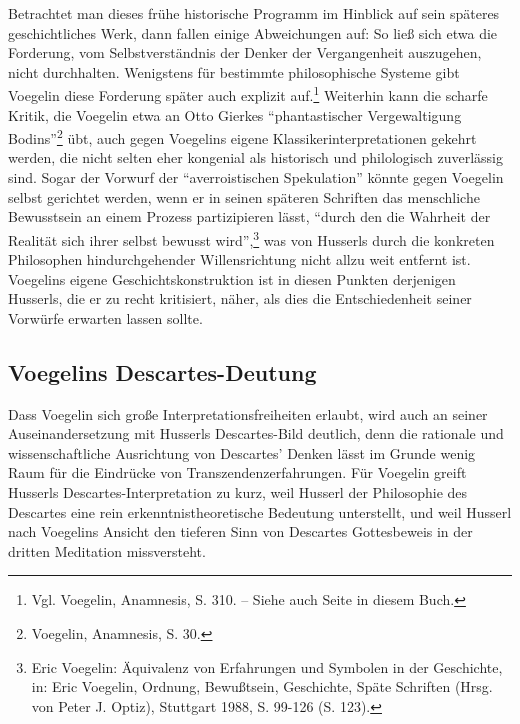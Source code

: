 Betrachtet man dieses frühe historische Programm im Hinblick auf sein späteres
geschichtliches Werk, dann fallen einige Abweichungen auf: So ließ sich etwa
die Forderung, vom Selbstverständnis der Denker der Vergangenheit auszugehen,
nicht durchhalten. Wenigstens für bestimmte philosophische Systeme gibt
Voegelin diese Forderung später auch explizit auf.\footnote{Vgl. Voegelin,
  Anamnesis, S. 310. -- Siehe auch Seite \pageref{Selbstzeugnisse2} in diesem
  Buch.}  Weiterhin kann die scharfe Kritik, die Voegelin etwa an Otto
Gierkes "`phantastischer Vergewaltigung Bodins"'\footnote{Voegelin, Anamnesis,
  S. 30.}  übt, auch gegen Voegelins eigene Klassikerinterpretationen gekehrt
werden, die nicht selten eher kongenial als historisch und philologisch
zuverlässig sind.  Sogar der Vorwurf der "`averroistischen Spekulation"'
könnte gegen Voegelin selbst gerichtet werden, wenn er in seinen späteren
Schriften das menschliche Bewusstsein an einem Prozess partizipieren lässt,
"`durch den die Wahrheit der Realität sich ihrer selbst bewusst
wird"',\footnote{Eric Voegelin: Äquivalenz von Erfahrungen und Symbolen in der
  Geschichte, in: Eric Voegelin, Ordnung, Bewußtsein, Geschichte, Späte
  Schriften (Hrsg. von Peter J. Optiz), Stuttgart 1988, S. 99-126 (S. 123).}
was von Husserls durch die konkreten Philosophen hindurchgehender
Willensrichtung nicht allzu weit entfernt ist.  Voegelins eigene
Geschichtskonstruktion ist in diesen Punkten derjenigen Husserls, die er zu
recht kritisiert, näher, als dies die Entschiedenheit seiner Vorwürfe erwarten
lassen sollte.


\subsection{Voegelins Descartes-Deutung}

Dass Voegelin sich große Interpretationsfreiheiten erlaubt, wird auch an
seiner Auseinandersetzung mit Husserls Descartes-Bild deutlich, denn die
rationale und wissenschaftliche Ausrichtung von Descartes' Denken lässt im
Grunde wenig Raum für die Eindrücke von Transzendenzerfahrungen. Für Voegelin
greift Husserls Descartes-Interpretation zu kurz, weil Husserl der Philosophie
des Descartes eine rein erkenntnistheoretische Bedeutung unterstellt, und weil
Husserl nach Voegelins Ansicht den tieferen Sinn von Descartes Gottesbeweis in
der dritten Meditation missversteht.

